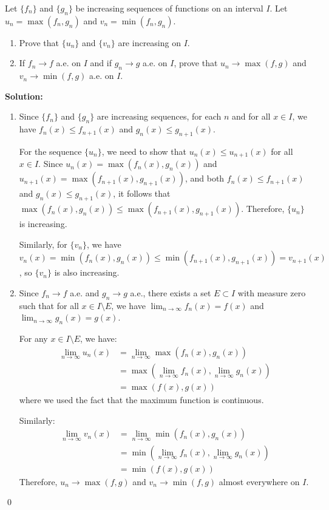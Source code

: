 \begin{problembox}
Let $\{f_n\}$ and $\{g_n\}$ be increasing sequences of functions on an interval $I$. Let $u_n = \max(f_n, g_n)$ and $v_n = \min(f_n, g_n)$.
\begin{enumerate}[label=(\alph*)]
    \item Prove that $\{u_n\}$ and $\{v_n\}$ are increasing on $I$.
    \item If $f_n \to f$ a.e. on $I$ and if $g_n \to g$ a.e. on $I$, prove that $u_n \to \max(f, g)$ and $v_n \to \min(f, g)$ a.e. on $I$.
\end{enumerate}
\end{problembox}

\noindent\textbf{Solution:}
\begin{enumerate}[label=(\alph*)]
    \item Since $\{f_n\}$ and $\{g_n\}$ are increasing sequences, for each $n$ and for all $x \in I$, we have $f_n(x) \leq f_{n+1}(x)$ and $g_n(x) \leq g_{n+1}(x)$. 

    For the sequence $\{u_n\}$, we need to show that $u_n(x) \leq u_{n+1}(x)$ for all $x \in I$. Since $u_n(x) = \max(f_n(x), g_n(x))$ and $u_{n+1}(x) = \max(f_{n+1}(x), g_{n+1}(x))$, and both $f_n(x) \leq f_{n+1}(x)$ and $g_n(x) \leq g_{n+1}(x)$, it follows that $\max(f_n(x), g_n(x)) \leq \max(f_{n+1}(x), g_{n+1}(x))$. Therefore, $\{u_n\}$ is increasing.

    Similarly, for $\{v_n\}$, we have $v_n(x) = \min(f_n(x), g_n(x)) \leq \min(f_{n+1}(x), g_{n+1}(x)) = v_{n+1}(x)$, so $\{v_n\}$ is also increasing.

    \item Since $f_n \to f$ a.e. and $g_n \to g$ a.e., there exists a set $E \subset I$ with measure zero such that for all $x \in I \setminus E$, we have $\lim_{n \to \infty} f_n(x) = f(x)$ and $\lim_{n \to \infty} g_n(x) = g(x)$.

    For any $x \in I \setminus E$, we have:
    \begin{align*}
    \lim_{n \to \infty} u_n(x) &= \lim_{n \to \infty} \max(f_n(x), g_n(x)) \\
    &= \max(\lim_{n \to \infty} f_n(x), \lim_{n \to \infty} g_n(x)) \\
    &= \max(f(x), g(x))
    \end{align*}
    where we used the fact that the maximum function is continuous.

    Similarly:
    \begin{align*}
    \lim_{n \to \infty} v_n(x) &= \lim_{n \to \infty} \min(f_n(x), g_n(x)) \\
    &= \min(\lim_{n \to \infty} f_n(x), \lim_{n \to \infty} g_n(x)) \\
    &= \min(f(x), g(x))
    \end{align*}
    Therefore, $u_n \to \max(f, g)$ and $v_n \to \min(f, g)$ almost everywhere on $I$.
\end{enumerate}\qed


